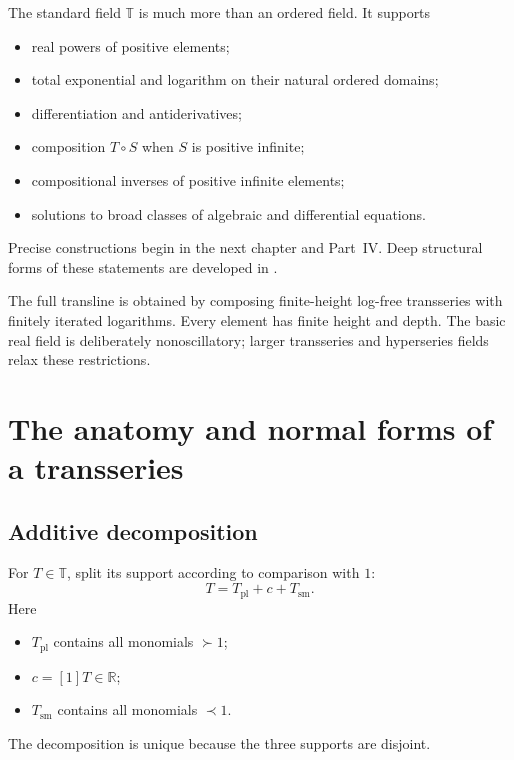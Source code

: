 \documentclass[11pt,oneside]{book}
\theoremstyle{definition}
\theoremstyle{remark}
\newcommand{\R}{\mathbb{R}}
\newcommand{\T}{\mathbb{T}}
\newcommand{\precdom}{\prec}
\newcommand{\succdom}{\succ}
\newcommand{\compose}{\mathbin{\circ}}
\begin{document}
The standard field $\T$ is much more than an ordered field. It supports
\begin{itemize}
\item real powers of positive elements;
\item total exponential and logarithm on their natural ordered domains;
\item differentiation and antiderivatives;
\item composition $T\compose S$ when $S$ is positive infinite;
\item compositional inverses of positive infinite elements;
\item solutions to broad classes of algebraic and differential equations.
\end{itemize}
Precise constructions begin in the next chapter and Part~IV. Deep structural
forms of these statements are developed in
\cite{vanDerHoevenBook,ADHBook}.

\begin{summarybox}
The full transline is obtained by composing finite-height log-free transseries
with finitely iterated logarithms. Every element has finite height and depth.
The basic real field is deliberately nonoscillatory; larger transseries and
hyperseries fields relax these restrictions.
\end{summarybox}

\chapter{The anatomy and normal forms of a transseries}
\label{ch:anatomy}

\section{Additive decomposition}

For $T\in\T$, split its support according to comparison with $1$:
\begin{equation}
  T=T_{\mathrm{pl}}+c+T_{\mathrm{sm}}.
  \label{eq:canonical-additive-decomposition}
\end{equation}
Here
\begin{itemize}
\item $T_{\mathrm{pl}}$ contains all monomials $\succdom1$;
\item $c=[1]T\in\R$;
\item $T_{\mathrm{sm}}$ contains all monomials $\precdom1$.
\end{itemize}
The decomposition is unique because the three supports are disjoint.
\end{document}
